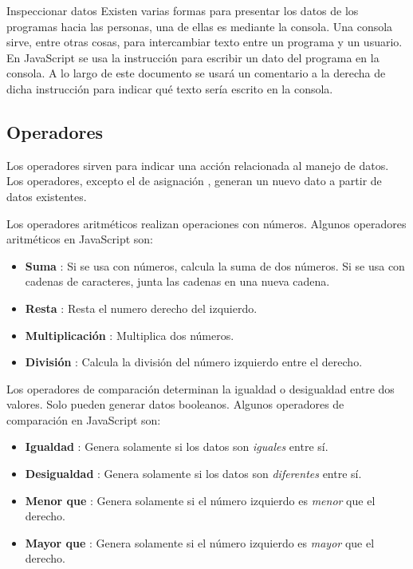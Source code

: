 \documentclass{article}
\newcommand{\code}[1]{\tcbox{\texttt{#1}}}
\newcommand{\codejs}[1]{\tcbox{\lstinline[style=ES6]{#1}}}
\newcommand{\operator}[2]{\item \textbf{#1} \codejs{#2}:}
\begin{document}


\begin{bclogo}[logo=\bcinfo, couleurBarre=orange, noborder=true, couleur=white]{Inspeccionar datos}
Existen varias formas para presentar los datos de los programas hacia las personas, una de ellas es mediante la consola. Una consola sirve, entre otras cosas, para intercambiar texto entre un programa y un usuario. En JavaScript se usa la instrucción \codejs{console.log( /* dato */ )} para escribir un dato del programa en la consola. A lo largo de este documento se usará un comentario a la derecha de dicha instrucción para indicar qué texto sería escrito en la consola.
\end{bclogo}

\subsection*{Operadores}
Los operadores sirven para indicar una acción relacionada al manejo de datos. Los operadores, excepto el de asignación \code{=}, generan un nuevo dato a partir de datos existentes.

\medskip
Los operadores aritméticos realizan operaciones con números. Algunos operadores aritméticos en JavaScript son:
\begin{itemize}
  \operator{Suma}{+} Si se usa con números, calcula la suma de dos números. Si se usa con cadenas de caracteres, junta las cadenas en una nueva cadena.
  \operator{Resta}{-} Resta el numero derecho del izquierdo.
  \operator{Multiplicación}{*} Multiplica dos números.
  \operator{División}{/} Calcula la división del número izquierdo entre el derecho.
\end{itemize}


\medskip
Los operadores de comparación determinan la igualdad o desigualdad entre dos valores. Solo pueden generar datos booleanos. Algunos operadores de comparación en JavaScript son:
\begin{itemize}
  \operator{Igualdad}{===} Genera \code{true} solamente si los datos son \textit{iguales} entre sí.
  \operator{Desigualdad}{!==} Genera \code{true} solamente si los datos son \textit{diferentes} entre sí.
  \operator{Menor que}{<} Genera \code{true} solamente si el número izquierdo es \textit{menor} que el derecho.
  \operator{Mayor que}{>} Genera \code{true} solamente si el número izquierdo es \textit{mayor} que el derecho.
\end{itemize}

\end{document}
